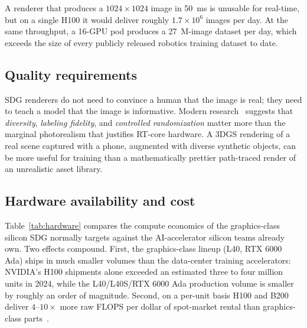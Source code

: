 \documentclass[10pt,journal,onecolumn]{IEEEtran}
\begin{document}
A renderer that produces a $1024{\times}1024$ image in 50~ms is
unusable for real-time, but on a single H100 it would deliver roughly
$1.7{\times}10^6$ images per day. At the same throughput, a 16-GPU pod
produces a 27~M-image dataset per day, which exceeds the size of every
publicly released robotics training dataset to date.

\subsection{Quality requirements}

SDG renderers do not need to convince a human that the image is real;
they need to teach a model that the image is informative. Modern
research~\cite{tobin2017domain,nvidia2024cosmos} suggests that
\emph{diversity}, \emph{labeling fidelity}, and \emph{controlled
randomization} matter more than the marginal photorealism that justifies
RT-core hardware. A 3DGS rendering of a real scene captured with a
phone, augmented with diverse synthetic objects, can be more useful for
training than a mathematically prettier path-traced render of an
unrealistic asset library.

\subsection{Hardware availability and cost}

Table~\ref{tab:hardware} compares the compute economics of the
graphics-class silicon SDG normally targets against the AI-accelerator
silicon teams already own. Two effects compound. First, the
graphics-class lineup (L40, RTX 6000 Ada) ships in much smaller
volumes than the data-center training accelerators: NVIDIA's H100
shipments alone exceeded an estimated three to four million units in
2024, while the L40\slash L40S\slash RTX 6000 Ada production volume is
smaller by roughly an order of magnitude. Second, on a per-unit basis
H100 and B200 deliver $4$--$10{\times}$ more raw FLOPS per dollar of
spot-market rental than graphics-class
parts~\cite{nvidia-hopper-h100,nvidia-blackwell-b200}.
\end{document}
